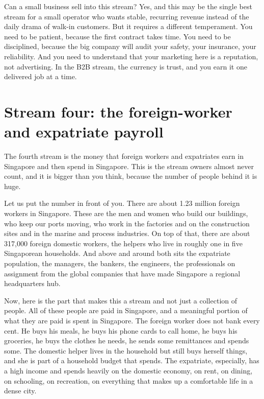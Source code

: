 \documentclass[10pt,twoside,openany]{memoir}
\newcommand{\needspacehead}{\needspace{4\baselineskip}}
\let\oldsection\section
\renewcommand{\section}{\needspacehead\oldsection}
\begin{document}
{{{{{{{{{{{{{{Can a small business sell into this stream? Yes, and this may be the
single best stream for a small operator who wants stable, recurring
revenue instead of the daily drama of walk-in customers. But it requires
a different temperament. You need to be patient, because the first
contract takes time. You need to be disciplined, because the big company
will audit your safety, your insurance, your reliability. And you need
to understand that your marketing here is a reputation, not advertising.
In the B2B stream, the currency is trust, and you earn it one delivered
job at a time.

\section{Stream four: the foreign-worker and expatriate
payroll}\label{stream-four-the-foreign-worker-and-expatriate-payroll}

The fourth stream is the money that foreign workers and expatriates earn
in Singapore and then spend in Singapore. This is the stream owners
almost never count, and it is bigger than you think, because the number
of people behind it is huge.

Let us put the number in front of you. There are about 1.23 million
foreign workers in Singapore. These are the men and women who build our
buildings, who keep our ports moving, who work in the factories and on
the construction sites and in the marine and process industries. On top
of that, there are about 317,000 foreign domestic workers, the helpers
who live in roughly one in five Singaporean households. And above and
around both sits the expatriate population, the managers, the bankers,
the engineers, the professionals on assignment from the global companies
that have made Singapore a regional headquarters hub.

Now, here is the part that makes this a stream and not just a collection
of people. All of these people are paid in Singapore, and a meaningful
portion of what they are paid is spent in Singapore. The foreign worker
does not bank every cent. He buys his meals, he buys his phone cards to
call home, he buys his groceries, he buys the clothes he needs, he sends
some remittances and spends some. The domestic helper lives in the
household but still buys herself things, and she is part of a household
budget that spends. The expatriate, especially, has a high income and
spends heavily on the domestic economy, on rent, on dining, on
schooling, on recreation, on everything that makes up a comfortable life
in a dense city.

}}}}}}}}}}}}}}
\end{document}

